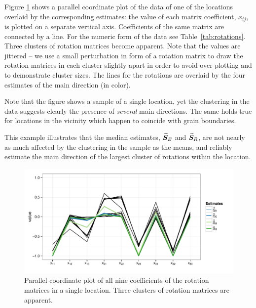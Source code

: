 \noindent Figure \ref{fig:pcp} shows a parallel coordinate plot of the data of one of the locations overlaid by the corresponding estimates: the value of each matrix coefficient, $x_{ij}$, is plotted on a separate vertical axis. Coefficients of the same matrix are connected by a line.  For the numeric form of the data see Table~\ref{tab:rotations}. Three clusters of rotation matrices become apparent. Note that the values are jittered -- we use a small perturbation in form of a rotation matrix to draw the rotation matrices in each cluster slightly apart  in order to avoid over-plotting and to demonstrate cluster sizes. The lines for the rotations are overlaid by the four estimates of the main direction (in color).

\noindent Note that the figure shows a sample of a single location, yet the clustering in the data suggests clearly the presence of \emph{several} main directions. The same holds true for locations in the vicinity which happen to coincide with grain boundaries. 

\noindent This example illustrates that the median estimates, ${\widetilde{\bm S}_E}$  and ${\widetilde{\bm S}_R}$, are not nearly as much affected by the clustering in the sample as the means, and reliably estimate the main direction of the largest cluster of rotations within the location.


\begin{figure}[htbp] %
   \centering
   \includegraphics[width=.7\textwidth]{images/pcp.pdf} 
   \caption{ \label{fig:pcp}Parallel coordinate plot of all nine coefficients of the rotation matrices in a single location. Three clusters of rotation matrices are apparent.  }
\end{figure}



